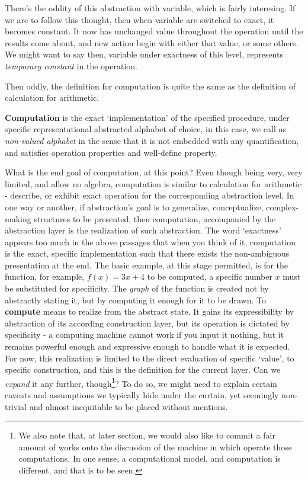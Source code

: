 There's the oddity of this abstraction with variable, which is fairly interesing. If we are to follow this thought, then when variable are switched to exact, it becomes constant. It now has unchanged value throughout the operation until the results come about, and new action begin with either that value, or some others. We might want to say then, variable under exactness of this level, represents \textit{temporary constant} in the operation. 

Then oddly, the definition for computation is quite the same as the definition of calculation for arithmetic. 

\begin{definition}[Computation, I]
    \textbf{Computation} is the exact `implementation' of the specified procedure, under specific representational abstracted alphabet of choice, in this case, we call as \textit{non-valued alphabet} in the sense that it is not embedded with any quantification, and satisfies operation properties and well-define property.
\end{definition}

What is the end goal of computation, at this point? Even though being very, very limited, and allow no algebra, computation is similar to calculation for arithmetic - describe, or exhibit exact operation for the corresponding abstraction level. In one way or another, if abstraction's goal is to generalize, conceptualize, complex-making structures to be presented, then computation, accompanied by the abstraction layer is the realization of such abstraction. The word `exactness' appears too much in the above passages that when you think of it, computation is the exact, specific implementation such that there exists the non-ambiguous presentation at the end. The basic example, at this stage permitted, is for the function, for example, $f(x)=3x+4$ to be computed, a specific number $x$ must be substituted for specificity. The \textit{graph} of the function is created not by abstractly stating it, but by computing it enough for it to be drawn. To \textbf{compute} means to realize from the abstract state. It gains its expressibility by abstraction of its according construction layer, but its operation is dictated by specificity - a computing machine cannot work if you input it nothing, but it remains powerful enough and expressive enough to handle what it is expected. For now, this realization is limited to the direct evaluation of specific `value', to specific construction, and this is the definition for the current layer. Can we \textit{expand} it any further, though\footnote{We also note that, at later section, we would also like to commit a fair amount of works onto the discussion of the machine in which operate those computations. In one sense, a computational model, and computation is different, and that is to be seen.}? To do so, we might need to explain certain caveats and assumptions we typically hide under the curtain, yet seemingly non-trivial and almost inequitable to be placed without mentions. 

